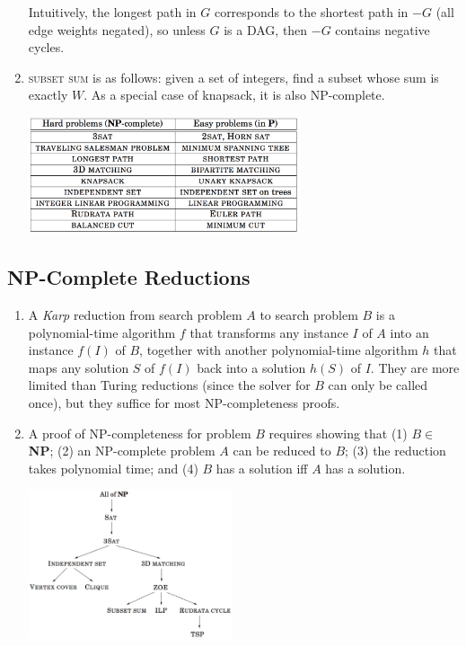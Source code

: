 \documentclass[10pt]{article}
\begin{document}
\begin{multicols}{2}
\begin{addmargin}[0.8em]{0.5em}
\begin{enumerate}[label=(\alph*)]
        Intuitively, the longest path in $G$ corresponds to the shortest path in $-G$ (all edge weights negated), so unless $G$ is a DAG, then $-G$ contains negative cycles.
        
        \item \textsc{subset sum} is as follows: given a set of integers, find a subset whose sum is exactly $W$. As a special case of knapsack, it is also NP-complete.
        \vspace{-0.2cm}
        \begin{center}
        \includegraphics[width=8cm]{np_complete.png}
        \end{center}
    \end{enumerate}
    
    \vspace{-0.4cm}
    \subsection{NP-Complete Reductions}
    \vspace{-0.2cm}
    \begin{enumerate}[label=(\alph*)]
        \item A \textit{Karp} reduction from search problem $A$ to search problem $B$ is a polynomial-time algorithm $f$ that transforms any instance $I$ of $A$ into an instance $f(I)$ of $B$, together with another polynomial-time algorithm $h$ that maps any solution $S$ of $f(I)$ back into a solution $h(S)$ of $I$. They are more limited than Turing reductions (since the solver for $B$ can only be called once), but they suffice for most NP-completeness proofs.        
        \item A proof of NP-completeness for problem $B$ requires showing that (1) $B \in$ \textbf{NP}; (2) an NP-complete problem $A$ can be reduced to $B$; (3) the reduction takes polynomial time; and (4) $B$ has a solution iff $A$ has a solution.
        
        \begin{center}
        \includegraphics[width=6cm]{reductions.png}
        \end{center}         
        

\end{enumerate}
\end{addmargin}
\end{multicols}
\end{document}

